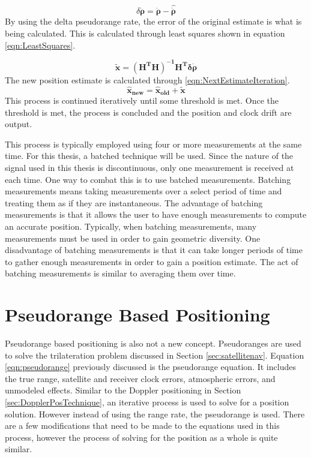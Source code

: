 \documentclass[12pt]{report}
\begin{document}
\begin{equation}
\delta \mathbf{\dot{\rho}} = \mathbf{\dot{\rho}} - \mathbf{\hat{\dot{\rho}}}
\label{eqn:deltarangerate}
\end{equation}
By using the delta pseudorange rate, the error of the original estimate is what is being calculated. This is calculated through least squares shown in equation \ref{eqn:LeastSquares}.

\begin{equation}
\mathbf{\tilde{x}} = \mathbf{(H^TH)^{-1} H^T \delta \dot{\rho}}
    \label{eqn:LeastSquares}
\end{equation}
The new position estimate is calculated through \ref{eqn:NextEstimateIteration}.
\begin{equation}
    \mathbf{\hat{x}_{new}} = \mathbf{\hat{x}_{old}} + \mathbf{\tilde{x}}
\label{eqn:NextEstimateIteration}
\end{equation}
This process is continued iteratively until some threshold is met. Once the threshold is met, the process is concluded and the position and clock drift are output.

This process is typically employed using four or more measurements at the same time. For this thesis, a batched technique will be used. Since the nature of the signal used in this thesis is discontinuous, only one measurement is received at each time. One way to combat this is to use batched measurements. Batching measurements means taking measurements over a select period of time and treating them as if they are instantaneous. The advantage of batching measurements is that it allows the user to have enough measurements to compute an accurate position. Typically, when batching measurements, many measurements must be used in order to gain geometric diversity. One disadvantage of batching measurements is that it can take longer periods of time to gather enough measurements in order to gain a position estimate. The act of batching measurements is similar to averaging them over time. 

\section{Pseudorange Based Positioning} \label{sec:PseudorangePosTechnique}
Pseudorange based positioning is also not a new concept. Pseudoranges are used to solve the trilateration problem discussed in Section \ref{sec:satellitenav}. Equation \ref{eqn:pseudorange} previously discussed is the pseudorange equation. It includes the true range, satellite and receiver clock errors, atmospheric errors, and unmodeled effects. Similar to the Doppler positioning in Section \ref{sec:DopplerPosTechnique}, an iterative process is used to solve for a position solution. However instead of using the range rate, the pseudorange is used. There are a few modifications that need to be made to the equations used in this process, however the process of solving for the position as a whole is quite similar. 
\end{document}
